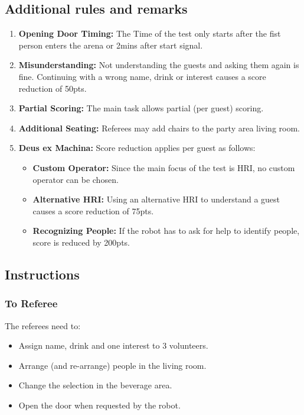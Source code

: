 \subsection*{Additional rules and remarks}
\begin{enumerate}[nosep]
	\item \textbf{Opening Door Timing:} The Time of the test only starts after the fist person enters the arena or 2mins after start signal.

	\item \textbf{Misunderstanding:} Not understanding the guests and asking them again is fine. Continuing with a wrong name, drink  or interest causes a score reduction of 50pts.
		
	\item \textbf{Partial Scoring:} The main task allows partial (per guest) scoring.

	\item \textbf{Additional Seating:} Referees may add chairs to the party area living room.
	
	\item \textbf{Deus ex Machina:} Score reduction applies per guest as follows:
	\begin{itemize}[nosep]
		\item \textbf{Custom Operator:} Since the main focus of the test is HRI, no custom operator can be chosen.
		\item \textbf{Alternative HRI:} Using an alternative HRI to understand a guest causes a score reduction of 75pts.
		\item \textbf{Recognizing People:} If the robot has to ask for help to identify people, score is reduced by 200pts. 
	\end{itemize}
\end{enumerate}


\subsection*{Instructions}

\subsubsection*{To Referee}

The referees need to:
\begin{itemize}
	\item Assign name, drink and one interest to 3 volunteers.
	\item Arrange (and re-arrange) people in the living room.
	\item Change the selection in the beverage area.
	\item Open the door when requested by the robot.
\end{itemize}

